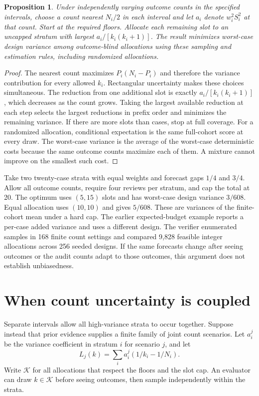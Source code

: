 \documentclass[11pt]{article}
\newtheorem{proposition}{Proposition}
\begin{document}
\begin{proposition}
Under independently varying outcome counts in the specified intervals,
choose a count nearest $N_i/2$ in each interval and let $a_i$ denote
$w_i^2 S_i^2$ at that count. Start at the required floors. Allocate
each remaining slot to an uncapped stratum with largest
$a_i/[k_i(k_i+1)]$. The result minimizes worst-case design variance
among outcome-blind allocations using these sampling and estimation
rules, including randomized allocations.
\end{proposition}
\begin{proof}
The nearest count maximizes $P_i(N_i-P_i)$ and therefore the
variance contribution for every allowed $k_i$. Rectangular
uncertainty makes these choices simultaneous. The reduction
from one additional slot is exactly $a_i/[k_i(k_i+1)]$, which
decreases as the count grows. Taking the largest available
reduction at each step selects the largest reductions in prefix
order and minimizes the remaining variance. If there are more
slots than cases, stop at full coverage. For a randomized
allocation, conditional expectation is the same full-cohort
score at every draw. The worst-case variance is the average of
the worst-case deterministic costs because the same outcome
counts maximize each of them. A mixture cannot improve on the
smallest such cost.
\end{proof}

Take two twenty-case strata with equal weights and forecast
gaps $1/4$ and $3/4$. Allow all outcome counts, require four
reviews per stratum, and cap the total at 20. The optimum
uses $(5,15)$ slots and has worst-case design variance $3/608$.
Equal allocation uses $(10,10)$ and gives $5/608$. These are
variances of the finite-cohort mean under a hard cap. The earlier
expected-budget example reports a per-case added variance and
uses a different design. The verifier enumerated samples in
168 finite count settings and compared 9,828 feasible integer
allocations across 256 seeded designs. If the same forecasts
change after seeing outcomes or the audit counts adapt to those
outcomes, this argument does not establish unbiasedness.

\section{When count uncertainty is coupled}
Separate intervals allow all high-variance strata to occur
together. Suppose instead that prior evidence supplies a finite
family of joint count scenarios. Let $a_i^j$ be the variance
coefficient in stratum $i$ for scenario $j$, and let
\[
 L_j(k)=\sum_i a_i^j(1/k_i-1/N_i).
\]
Write $\mathcal K$ for all allocations that respect the floors
and the slot cap. An evaluator can draw $k\in\mathcal K$ before
seeing outcomes, then sample independently within the strata.
\end{document}
